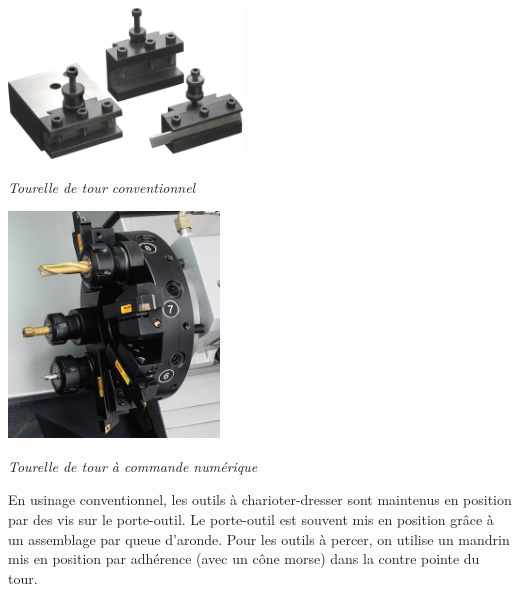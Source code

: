 \documentclass[11pt,oneside]{article}
\begin{document}
\begin{minipage}[c]{.45\linewidth}
\begin{center}
\includegraphics[height=4cm]{png/tourelle_2}

\textit{Tourelle de tour conventionnel}
\end{center}
\end{minipage}\hfill
\begin{minipage}[c]{.45\linewidth}
\begin{center}
\includegraphics[height=6cm]{png/tourelle}

\textit{Tourelle de tour à commande numérique}
\end{center}
\end{minipage}


En usinage conventionnel, les outils à charioter-dresser sont maintenus en position par des vis sur le porte-outil. Le porte-outil est souvent mis en position grâce à un assemblage par queue d'aronde. Pour les outils à percer, on utilise un mandrin mis en position par adhérence (avec un cône morse) dans la contre pointe du tour. 
\end{document}
